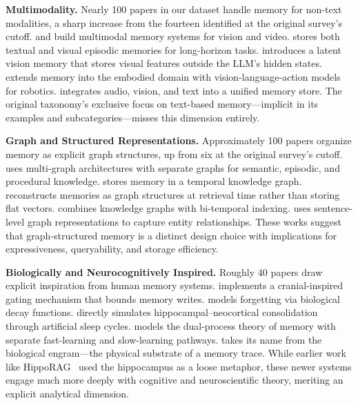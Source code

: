 \textbf{Multimodality.} Nearly 100 papers in our dataset handle memory for non-text modalities, a sharp increase from the fourteen identified at the original survey's cutoff. \citet{Unknown2025MemVerse} and \citet{Unknown2025WorldMM} build multimodal memory systems for vision and video. \citet{Unknown2026TeleMem} stores both textual and visual episodic memories for long-horizon tasks. \citet{Unknown2025VisMem} introduces a latent vision memory that stores visual features outside the LLM's hidden states. \citet{Unknown2025MemoryVLA} extends memory into the embodied domain with vision-language-action models for robotics. \citet{Unknown2025SeeingListeningRemem} integrates audio, vision, and text into a unified memory store. The original taxonomy's exclusive focus on text-based memory---implicit in its examples and subcategories---misses this dimension entirely.

\textbf{Graph and Structured Representations.} Approximately 100 papers organize memory as explicit graph structures, up from six at the original survey's cutoff. \citet{Unknown2026MAGMA} uses multi-graph architectures with separate graphs for semantic, episodic, and procedural knowledge. \citet{Unknown2025Zep} stores memory in a temporal knowledge graph. \citet{Unknown2026MRAgent} reconstructs memories as graph structures at retrieval time rather than storing flat vectors. \citet{Unknown2026Engram} combines knowledge graphs with bi-temporal indexing. \citet{Unknown2025SGMem} uses sentence-level graph representations to capture entity relationships. These works suggest that graph-structured memory is a distinct design choice with implications for expressiveness, queryability, and storage efficiency.

\textbf{Biologically and Neurocognitively Inspired.} Roughly 40 papers draw explicit inspiration from human memory systems. \citet{Unknown2026CraniMem} implements a cranial-inspired gating mechanism that bounds memory writes. \citet{Unknown2026FadeMem} models forgetting via biological decay functions. \citet{Unknown2026SCM} directly simulates hippocampal--neocortical consolidation through artificial sleep cycles. \citet{Unknown2026HumanInspiredMemoryA} models the dual-process theory of memory with separate fast-learning and slow-learning pathways. \citet{Unknown2026Engram} takes its name from the biological engram---the physical substrate of a memory trace. While earlier work like HippoRAG~\cite{Unknown2024HippoRAG} used the hippocampus as a loose metaphor, these newer systems engage much more deeply with cognitive and neuroscientific theory, meriting an explicit analytical dimension.

